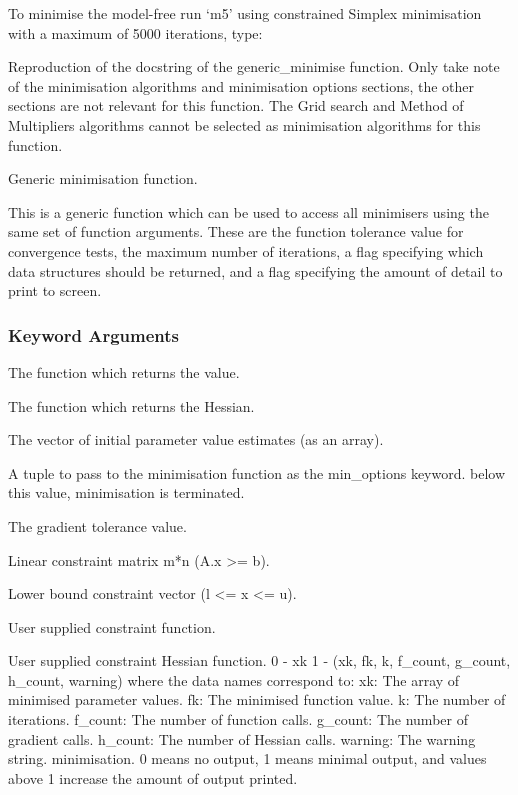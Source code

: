 


To minimise the model-free run `m5' using constrained Simplex minimisation with a maximum of
5000 iterations, type:




Reproduction of the docstring of the generic\_minimise function.  Only take note of the
minimisation algorithms and minimisation options sections, the other sections are not
relevant for this function.  The Grid search and Method of Multipliers algorithms cannot be
selected as minimisation algorithms for this function.


Generic minimisation function.

This is a generic function which can be used to access all minimisers using the same set of
function arguments.  These are the function tolerance value for convergence tests, the maximum
number of iterations, a flag specifying which data structures should be returned, and a flag
specifying the amount of detail to print to screen.


\subsubsection{Keyword Arguments}

  The function which returns the value.

  The function which returns the Hessian.

  The vector of initial parameter value estimates (as an array).

  A tuple to pass to the minimisation function as the min\_options keyword.
below this value, minimisation is terminated.

  The gradient tolerance value.

  Linear constraint matrix m*n (A.x >= b).

  Lower bound constraint vector (l <= x <= u).

  User supplied constraint function.

  User supplied constraint Hessian function.
 0 - xk 1 - (xk, fk, k, f\_count, g\_count, h\_count, warning) where the data names correspond to: xk:      The array of minimised parameter values. fk:      The minimised function value. k:       The number of iterations. f\_count: The number of function calls. g\_count: The number of gradient calls. h\_count: The number of Hessian calls. warning: The warning string.
minimisation.  0 means no output, 1 means minimal output, and values above 1 increase the amount
of output printed.


